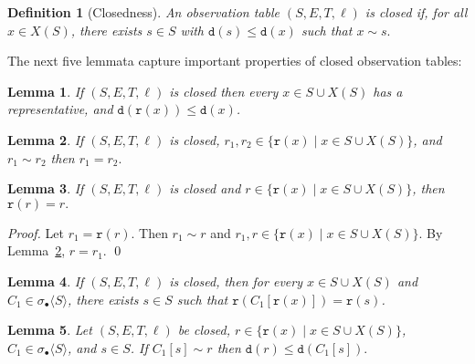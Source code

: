 \documentclass[preprint,12pt,english]{article}
\def\hole{\bullet}
\def\tr{\mathtt{r}}
\def\depth{\mathtt{d}}
\newcommand\pair[1]{\langle{#1}\rangle}
\newtheorem{definition}{Definition}
\newtheorem{lemma}{Lemma}
\begin{document}
\begin{definition}[Closedness]
An observation table $(S,E,T,\ell)$ is closed if, for all $x\in X(S)$, there exists $s\in S$ with $\depth(s)\leq \depth(x)$ such that $x\sim s.$
\end{definition}
The next five lemmata capture  important properties of closed observation tables:
\begin{lemma}
\label{lema2}
If $(S,E,T,\ell)$ is closed then every $x\in S\cup X(S)$ has a representative, and $\depth(\tr(x))\leq \depth(x)$.
\end{lemma}
\begin{lemma}
\label{lema4}
If $(S,E,T,\ell)$ is closed, $r_1,r_2\in\{\tr(x)\mid x\in S\cup X(S)\}$, and $r_1\sim r_2$ then $r_1=r_2.$ 
\end{lemma}
\begin{lemma}
\label{lema5}
If  $(S,E,T,\ell)$ is closed and $r\in\{\tr(x)\mid x\in S\cup X(S)\}$, then $\tr(r)=r.$
\end{lemma}
\begin{proof}
Let $r_1=\tr(r).$ Then $r_1\sim r$ and $r_1,r\in \{\tr(x)\mid x\in S\cup X(S)\}.$ By Lemma~\ref{lema4}, $r=r_1.$
\qed
\end{proof}
\begin{lemma}
\label{lema6}
If $(S,E,T,\ell)$ is closed, then for every $x\in S\cup X(S)$ and $C_1\in\sigma_\hole\pair{S}$, there exists $s\in S$ such that $\tr(C_1[\tr(x)])= \tr(s)$.
\end{lemma}

\begin{lemma}
\label{lem6}
Let $(S,E,T,\ell)$ be closed, $r\in \{\tr(x)\mid x\in S\cup X(S)\}$, $C_1\in\sigma_\hole\pair{S}$, and $s\in S$.  If $C_1[s]\sim r$ then $\depth(r)\leq \depth(C_1[s]).$
\end{lemma}
\end{document}
